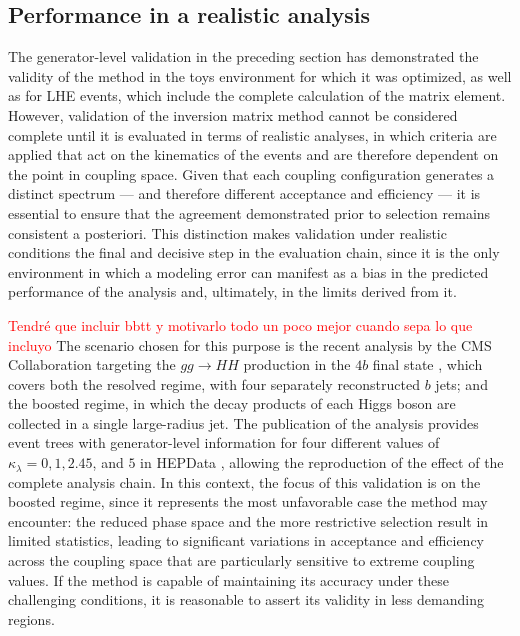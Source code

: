 \subsection{Performance in a realistic analysis}
\label{subsec:realistic}
The generator-level validation in the preceding section has demonstrated the validity of the method in the toys environment for which it was optimized, as well as for LHE events, which include the complete calculation of the matrix element. However, validation of the inversion matrix method cannot be considered complete until it is evaluated in terms of realistic analyses, in which criteria are applied that act on the kinematics of the events and are therefore dependent on the point in coupling space. Given that each coupling configuration generates a distinct spectrum — and therefore different acceptance and efficiency — it is essential to ensure that the agreement demonstrated prior to selection remains consistent a posteriori. This distinction makes validation under realistic conditions the final and decisive step in the evaluation chain, since it is the only environment in which a modeling error can manifest as a bias in the predicted performance of the analysis and, ultimately, in the limits derived from it.

\textcolor{red}{Tendré que incluir bbtt y motivarlo todo un poco mejor cuando sepa lo que incluyo} The scenario chosen for this purpose is the recent analysis by the CMS Collaboration targeting the $gg\to HH$ production in the $4b$ final state \cite{CMS:2026znu}, which covers both the resolved regime, with four separately reconstructed $b$ jets; and the boosted regime, in which the decay products of each Higgs boson are collected in a single large-radius jet. The publication of the analysis provides event trees with generator-level information for four different values of $\kappa_\lambda = 0, 1, 2.45$, and $5$ in HEPData \cite{hepdata.171917}, allowing the reproduction of the effect of the complete analysis chain. In this context, the focus of this validation is on the boosted regime, since it represents the most unfavorable case the method may encounter: the reduced phase space and the more restrictive selection result in limited statistics, leading to significant variations in acceptance and efficiency across the coupling space that are particularly sensitive to extreme coupling values. If the method is capable of maintaining its accuracy under these challenging conditions, it is reasonable to assert its validity in less demanding regions.\\


